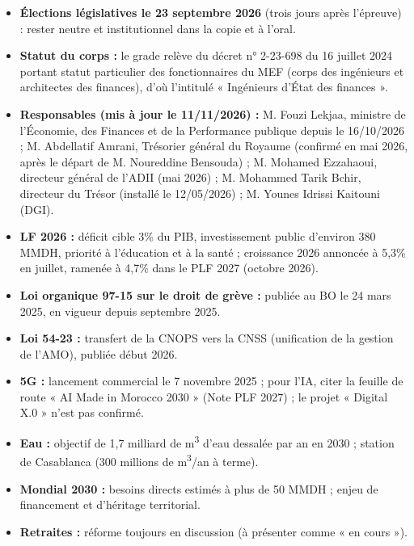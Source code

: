 \begin{tcolorbox}[colback=red!4!white,colframe=red!60!black,title=\textbf{Mise à jour du 17 septembre 2026}]
\begin{itemize}
    \item \textbf{Élections législatives le 23 septembre 2026} (trois jours après l'épreuve) : rester neutre et institutionnel dans la copie et à l'oral.
    \item \textbf{Statut du corps :} le grade relève du décret n° 2-23-698 du 16 juillet 2024 portant statut particulier des fonctionnaires du MEF (corps des ingénieurs et architectes des finances), d'où l'intitulé « Ingénieurs d'État des finances ».
    \item \textbf{Responsables (mis à jour le 11/11/2026) :} M. Fouzi Lekjaa, ministre de l'Économie, des Finances et de la Performance publique depuis le 16/10/2026 ; M. Abdellatif Amrani, Trésorier général du Royaume (confirmé en mai 2026, après le départ de M. Noureddine Bensouda) ; M. Mohamed Ezzahaoui, directeur général de l'ADII (mai 2026) ; M. Mohammed Tarik Bchir, directeur du Trésor (installé le 12/05/2026) ; M. Younes Idrissi Kaitouni (DGI).
    \item \textbf{LF 2026 :} déficit cible 3\% du PIB, investissement public d'environ 380 MMDH, priorité à l'éducation et à la santé ; croissance 2026 annoncée à 5,3\% en juillet, ramenée à 4,7\% dans le PLF 2027 (octobre 2026).
    \item \textbf{Loi organique 97-15 sur le droit de grève :} publiée au BO le 24 mars 2025, en vigueur depuis septembre 2025.
    \item \textbf{Loi 54-23 :} transfert de la CNOPS vers la CNSS (unification de la gestion de l'AMO), publiée début 2026.
    \item \textbf{5G :} lancement commercial le 7 novembre 2025 ; pour l'IA, citer la feuille de route « AI Made in Morocco 2030 » (Note PLF 2027) ; le projet « Digital X.0 » n'est pas confirmé.
    \item \textbf{Eau :} objectif de 1,7 milliard de m\textsuperscript{3} d'eau dessalée par an en 2030 ; station de Casablanca (300 millions de m\textsuperscript{3}/an à terme).
    \item \textbf{Mondial 2030 :} besoins directs estimés à plus de 50 MMDH ; enjeu de financement et d'héritage territorial.
    \item \textbf{Retraites :} réforme toujours en discussion (à présenter comme « en cours »).
\end{itemize}
\end{tcolorbox}

